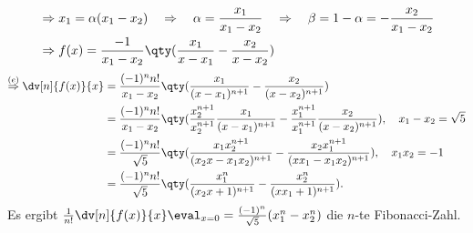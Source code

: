 \begin{enumerate}[label=(\alph*)]
\begin{align}
            &\Rightarrow x_1 = \alpha (x_1 - x_2) \quad \Rightarrow \quad \alpha = \frac{x_1}{x_1-x_2} \quad \Rightarrow\quad \beta = 1-\alpha = -\frac{x_2}{x_1-x_2} \\
            &\Rightarrow f(x) = \frac{-1}{x_1-x_2}\qty(\frac{x_1}{x-x_1}- \frac{x_2}{x-x_2})
        \end{align}
        \begin{align}
            \overset{(e)}{\Rightarrow} \dv[n]{f(x)}{x} &= \frac{(-1)^n n!}{x_1-x_2} \qty(\frac{x_1}{(x-x_1)^{n+1}} - \frac{x_2}{(x-x_2)^{n+1}}) \\
            &= \frac{(-1)^n n!}{x_1-x_2} \qty(\frac{x_2^{n+1}}{x_2^{n+1}} \frac{x_1}{(x-x_1)^{n+1}} - \frac{x_1^{n+1}}{x_1^{n+1}} \frac{x_2}{(x-x_2)^{n+1}}), \quad x_1-x_2 =  \sqrt{5}\\
            &= \frac{(-1)^n n!}{\sqrt{5}} \qty( \frac{x_1 x_2^{n+1}}{(x_2x-x_1x_2)^{n+1}} -  \frac{x_2 x_1^{n+1}}{(xx_1-x_1x_2)^{n+1}}), \quad x_1 x_2 = -1 \\
            &= \frac{(-1)^n n!}{\sqrt{5}} \qty( \frac{x_1^n}{(x_2x+1)^{n+1}} -  \frac{x_2^n}{(xx_1+1)^{n+1}}).
        \end{align}
        Es ergibt $\frac{1}{n!} \dv[n]{f(x)}{x}\eval_{x=0} = \frac{(-1)^n}{\sqrt{5}}(x_1^n -x_2^n)$ die $n$-te Fibonacci-Zahl.
    \end{enumerate}
%
\newpage
